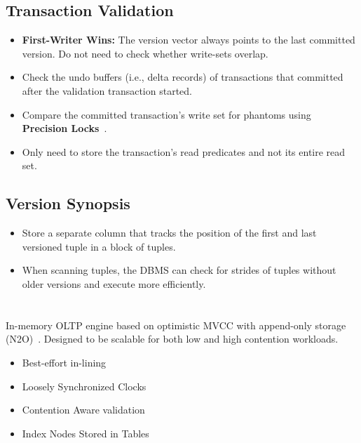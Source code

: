 \documentclass[11pt]{article}
\begin{document}
\subsection*{Transaction Validation}
\begin{itemize}
    \item \textbf{First-Writer Wins:}
    The version vector always points to the last committed version. Do not 
    need to check whether write-sets overlap.
    
    \item 
    Check the undo buffers (i.e., delta records) of transactions that committed after the 
    validation transaction started.
    
    \item
    Compare the committed transaction's write set for phantoms using \textbf{Precision 
    Locks}~\cite{jordan81}.
    
    \item
    Only need to store the transaction's read predicates and not its entire read set.
\end{itemize}

\subsection*{Version Synopsis}
\begin{itemize}
    \item
    Store a separate column that tracks the position of the first and last versioned tuple in 
    a block of tuples.

    \item
    When scanning tuples, the DBMS can check for strides of tuples without older versions and 
    execute more efficiently.
\end{itemize}

\section{}
In-memory OLTP engine based on optimistic MVCC with append-only storage (N2O)~\cite{p21-lim}.
Designed to be scalable for both low and high contention workloads.
\begin{itemize}
    \item Best-effort in-lining
    \item Loosely Synchronized Clocks
    \item Contention Aware validation
    \item Index Nodes Stored in Tables
\end{itemize}
\end{document}
